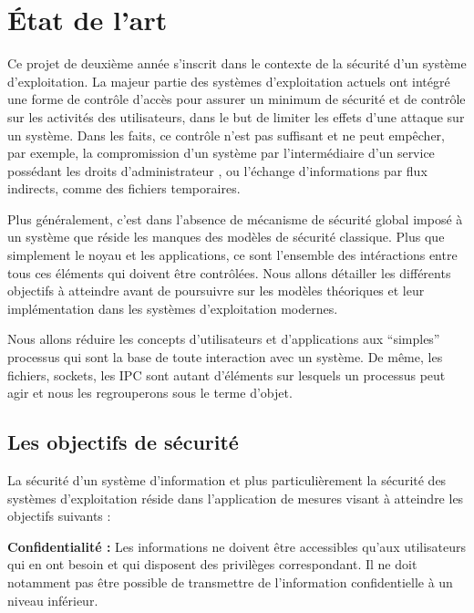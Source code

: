 \section{\'Etat de l'art}

Ce projet de deuxième année s'inscrit dans le contexte de la sécurité d'un système d'exploitation. La majeur partie des systèmes d'exploitation actuels ont intégré une forme de contrôle d'accès pour assurer un minimum de sécurité et de contrôle sur les activités des utilisateurs, dans le but de limiter les effets d'une attaque sur un système. Dans les faits, ce contrôle n'est pas suffisant et ne peut empêcher, par exemple, la compromission d'un système par l'intermédiaire d'un service possédant les droits d'administrateur \cite{TIOF}, ou l'échange d'informations par flux indirects, comme des fichiers temporaires.

Plus généralement, c'est dans l'absence de mécanisme de sécurité global imposé à un système que réside les manques des modèles de sécurité classique. Plus que simplement le noyau et les applications, ce sont l'ensemble des intéractions entre tous ces éléments qui doivent être contrôlées. Nous allons détailler les différents objectifs à atteindre avant de poursuivre sur les modèles théoriques et leur implémentation dans les systèmes d'exploitation modernes.


Nous allons réduire les concepts d'utilisateurs et d'applications aux ``simples'' processus qui sont la base de toute interaction avec un système. De même, les fichiers, sockets, les IPC sont autant d'éléments sur lesquels un processus peut agir et nous les regrouperons sous le terme d'objet.

\subsection{Les objectifs de sécurité}

La sécurité d'un système d'information et plus particulièrement la sécurité des systèmes d'exploitation réside dans l'application de mesures visant à atteindre les objectifs suivants :

\textbf{Confidentialité :}
Les informations ne doivent être accessibles qu'aux utilisateurs qui en ont besoin et qui disposent des privilèges correspondant. Il ne doit notamment pas être possible de transmettre de l'information confidentielle à un niveau inférieur.

